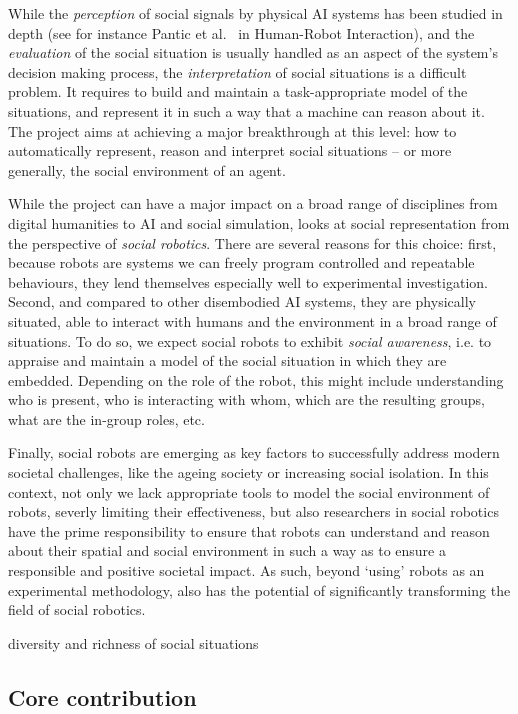 While the \emph{perception} of social signals by physical AI systems has been
studied in depth (see for instance Pantic et al.~\cite{pantic2011} in
Human-Robot Interaction), and the \emph{evaluation} of the social situation is
usually handled as an aspect of the system's decision making process, the
\emph{interpretation} of social situations is a difficult problem.  It requires
to build and maintain a task-appropriate model of the situations, and represent
it in such a way that a machine can reason about it.
The \project project aims at achieving a major breakthrough at this level: how
to automatically represent, reason and interpret social situations -- or more
generally, the social environment of an agent.


While the project can have a major impact on a broad range of disciplines from
digital humanities to AI and social simulation, \project looks at social
representation from the perspective of \emph{social robotics}.  There are
several reasons for this choice: first, because robots are systems we can freely
program controlled and repeatable behaviours, they lend themselves especially
well to experimental investigation.  Second, and compared to other disembodied
AI systems, they are physically situated, able to interact with humans and the
environment in a broad range of situations. To do so, we expect social robots to
exhibit \emph{social awareness}, i.e. to appraise and maintain a model of the
social situation in which they are embedded. Depending on the role of the robot,
this might include understanding who is present, who is interacting with whom,
which are the resulting groups, what are the in-group roles,  etc.

Finally, social robots are emerging as key factors to successfully address
modern societal challenges, like the ageing society or increasing social
isolation. In this context, not only we lack appropriate tools to model the
social environment of robots, severly limiting their effectiveness, but also
researchers in social robotics have the prime responsibility to ensure that
robots can understand and reason about their spatial and social environment in
such a way as to ensure a responsible and positive societal impact. As such,
beyond `using' robots as an experimental methodology, \project also has the
potential of significantly transforming the field of social robotics.


diversity and richness of social situations

\subsection{Core contribution}


